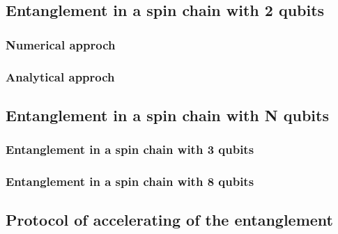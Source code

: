 
\subsection{Entanglement in a spin chain with 2 qubits}

\subsubsection{Numerical approch}


\subsubsection{Analytical approch}


\subsection{Entanglement in a spin chain with N qubits}

\subsubsection{Entanglement in a spin chain with 3 qubits}


\subsubsection{Entanglement in a spin chain with 8 qubits}


\subsection{Protocol of accelerating of the entanglement}
